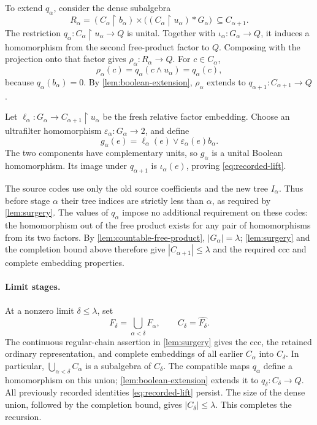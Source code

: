 \documentclass[11pt]{article}
\theoremstyle{definition}
\theoremstyle{remark}
\newcommand{\restr}{\mathbin{\upharpoonright}}
\begin{document}
To extend $q_\alpha$, consider the dense subalgebra
\[
 R_\alpha=(C_\alpha\restr b_\alpha)\times
             \bigl((C_\alpha\restr u_\alpha)*G_\alpha\bigr)
 \ \subseteq C_{\alpha+1}.
\]
The restriction $q_\alpha:C_\alpha\restr u_\alpha\to Q$ is
unital. Together with $\iota_\alpha:G_\alpha\to Q$, it induces a
homomorphism from the second free-product factor to $Q$. Composing
with the projection onto that factor gives
$\rho_\alpha:R_\alpha\to Q$. For $c\in C_\alpha$,
\[
 \rho_\alpha(c)=q_\alpha(c\wedge u_\alpha)=q_\alpha(c),
\]
because $q_\alpha(b_\alpha)=0$.
By \cref{lem:boolean-extension}, $\rho_\alpha$ extends to
$q_{\alpha+1}:C_{\alpha+1}\to Q$.

Let $\ell_\alpha:G_\alpha\to C_{\alpha+1}\restr u_\alpha$
be the fresh relative factor embedding. Choose an ultrafilter
homomorphism $\varepsilon_\alpha:G_\alpha\to2$, and define
\begin{equation}\label{eq:unital-splice}
 g_\alpha(e)=\ell_\alpha(e)\vee\varepsilon_\alpha(e)b_\alpha.
\end{equation}
The two components have complementary units, so $g_\alpha$ is a
unital Boolean homomorphism. Its image under $q_{\alpha+1}$ is
$\iota_\alpha(e)$, proving \eqref{eq:recorded-lift}.

The source codes use only the old source coefficients and the new
tree $I_\alpha$. Thus before stage $\alpha$ their tree indices are
strictly less than $\alpha$, as required by \cref{lem:surgery}.
The values of $q_\alpha$ impose no additional requirement on these
codes: the homomorphism out of the free product exists for any pair
of homomorphisms from its two factors. By
\cref{lem:countable-free-product}, $|G_\alpha|=\lambda$;
\cref{lem:surgery} and the completion bound above therefore give
$|C_{\alpha+1}|\leq\lambda$ and the required ccc and complete
embedding properties.

\paragraph{Limit stages.}
At a nonzero limit $\delta\leq\lambda$, set
\[
 F_\delta=\bigcup_{\alpha<\delta}F_\alpha,
 \qquad C_\delta=\widehat{F_\delta}.
\]
The continuous regular-chain assertion in \cref{lem:surgery} gives
the ccc, the retained ordinary representation, and complete embeddings
of all earlier $C_\alpha$ into $C_\delta$. In particular,
$\bigcup_{\alpha<\delta}C_\alpha$ is a subalgebra of $C_\delta$.
The compatible maps $q_\alpha$ define a homomorphism on this union;
\cref{lem:boolean-extension} extends it to $q_\delta:C_\delta\to Q$.
All previously recorded identities \eqref{eq:recorded-lift} persist.
The size of the dense union, followed by the completion bound, gives
$|C_\delta|\leq\lambda$. This completes the recursion.
\end{document}
